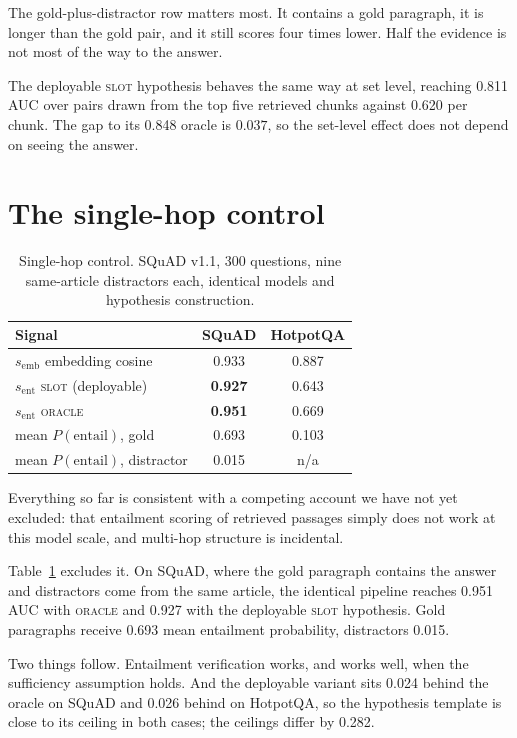 \documentclass[conference]{IEEEtran}
\newcommand{\semb}{s_{\mathrm{emb}}}
\newcommand{\sent}{s_{\mathrm{ent}}}
\begin{document}
The gold-plus-distractor row matters most. It contains a gold paragraph, it is
longer than the gold pair, and it still scores four times lower. Half the
evidence is not most of the way to the answer.

The deployable \textsc{slot} hypothesis behaves the same way at set level,
reaching 0.811 AUC over pairs drawn from the top five retrieved chunks against
0.620 per chunk. The gap to its 0.848 oracle is $0.037$, so the set-level effect
does not depend on seeing the answer.

\section{The single-hop control}
\label{sec:singlehop}

\begin{table}[t]
\centering
\caption{Single-hop control. SQuAD v1.1, 300 questions, nine same-article
distractors each, identical models and hypothesis construction.}
\label{tab:squad}
\begin{tabular}{@{}lcc@{}}
\toprule
\textbf{Signal} & \textbf{SQuAD} & \textbf{HotpotQA}\\
\midrule
$\semb$ embedding cosine           & 0.933 & 0.887\\
$\sent$ \textsc{slot} (deployable) & \textbf{0.927} & 0.643\\
$\sent$ \textsc{oracle}            & \textbf{0.951} & 0.669\\
\midrule
mean $P(\text{entail})$, gold       & 0.693 & 0.103\\
mean $P(\text{entail})$, distractor & 0.015 & n/a\\
\bottomrule
\end{tabular}
\end{table}

Everything so far is consistent with a competing account we have not yet
excluded: that entailment scoring of retrieved passages simply does not work at
this model scale, and multi-hop structure is incidental.

Table~\ref{tab:squad} excludes it. On SQuAD, where the gold paragraph contains
the answer and distractors come from the same article, the identical pipeline
reaches 0.951 AUC with \textsc{oracle} and 0.927 with the deployable
\textsc{slot} hypothesis. Gold paragraphs receive 0.693 mean entailment
probability, distractors 0.015.

Two things follow. Entailment verification works, and works well, when the
sufficiency assumption holds. And the deployable variant sits 0.024 behind the
oracle on SQuAD and 0.026 behind on HotpotQA, so the hypothesis template is
close to its ceiling in both cases; the ceilings differ by 0.282.
\end{document}
